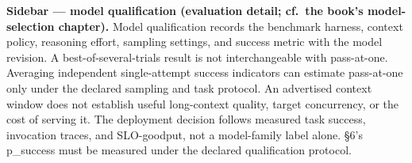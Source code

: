 \textbf{Sidebar --- model qualification (evaluation detail; cf.~the
book's model-selection chapter).} Model qualification records the
benchmark harness, context policy, reasoning effort, sampling settings,
and success metric with the model revision. A best-of-several-trials
result is not interchangeable with pass-at-one. Averaging independent
single-attempt success indicators can estimate pass-at-one only under
the declared sampling and task protocol. An advertised context window
does not establish useful long-context quality, target concurrency, or
the cost of serving it. The deployment decision follows measured task
success, invocation traces, and SLO-goodput, not a model-family label
alone. §6's p\_success must be measured under the declared qualification
protocol.

\label{common-mistakes}


